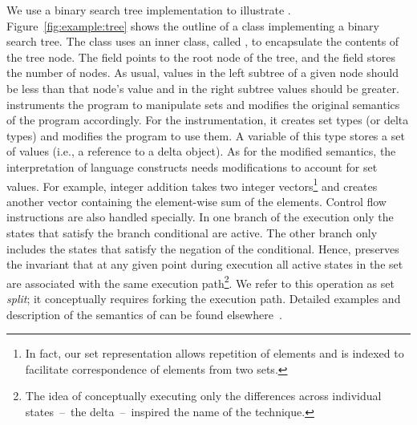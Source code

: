 \documentclass{sig-alternate}
\begin{document}
We use a binary search tree implementation to illustrate \dE{}.
Figure~\ref{fig:example:tree} shows the
outline of a class implementing a binary search tree.  The
 class uses an inner class, called , to
encapsulate the contents of the tree node. The field 
points to the root node of the tree, and the field 
stores the number of nodes.  As usual, values in the left subtree of a
given node should be less than that node's value and in the right
subtree values should be greater.  \dE{} instruments the program to
manipulate sets and modifies the original semantics of the program
accordingly.  For the instrumentation, it creates set types (or delta
types) and modifies the program to use them.  A variable of this type
stores a set of values (i.e., a reference to a delta object).  As for the
modified semantics, the interpretation of language constructs needs modifications to
account for set values.  For example, integer addition takes two
integer vectors\footnote{In fact, our set representation allows
  repetition of elements and is indexed to facilitate correspondence
  of elements from two sets.} and creates another vector containing
the element-wise sum of the elements.  Control flow instructions are
also handled specially.  In one branch of the execution only the
states that satisfy the branch conditional are active.  The other
branch only includes the states that satisfy the negation of the
conditional.  Hence, \DE{} preserves the invariant that at any given
point during execution all active states in the set are associated
with the same execution path\footnote{The idea of conceptually
  executing only the differences across individual states~--~the
  delta~--~inspired the name of the technique.}.  We refer to this
operation as set \emph{split}; it conceptually requires forking the
execution path.  Detailed examples and description of the semantics of
\DE{} can be found elsewhere~\cite{damorim:issta2007,dAmorimLM08}.

\end{document}
